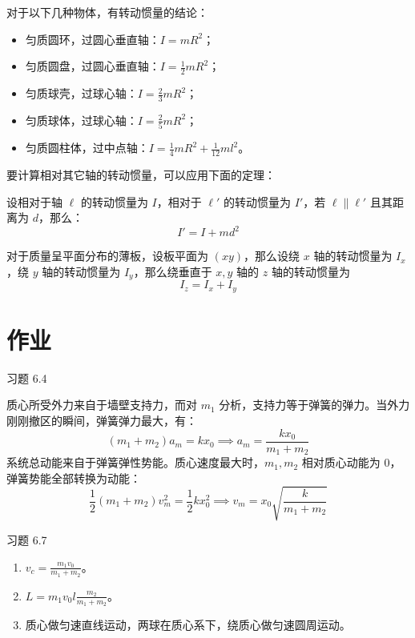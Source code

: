 对于以下几种物体，有转动惯量的结论：

\begin{itemize}
    \item 匀质圆环，过圆心垂直轴：$I = m R^2$；
    \item 匀质圆盘，过圆心垂直轴：$I = \frac{1}{2} m R^2$；
    \item 匀质球壳，过球心轴：$I = \frac{2}{3} m R^2$；
    \item 匀质球体，过球心轴：$I = \frac{2}{5} m R^2$；
    \item 匀质圆柱体，过中点轴：$I = \frac{1}{4} m R^2 + \frac{1}{12} m l^2$。
\end{itemize}

要计算相对其它轴的转动惯量，可以应用下面的定理：

\begin{theorem}[平行轴定理]
    设相对于轴 $\ell$ 的转动惯量为 $I$，相对于 $\ell'$ 的转动惯量为 $I'$，若 $\ell \parallel \ell'$ 且其距离为 $d$，那么：
    $$
    I' = I + m d^2
    $$
\end{theorem}

\begin{theorem}[薄板正交轴定理]
    对于质量呈平面分布的薄板，设板平面为 $(x y)$，那么设绕 $x$ 轴的转动惯量为 $I_x$，绕 $y$ 轴的转动惯量为 $I_y$，那么绕垂直于 $x, y$ 轴的 $z$ 轴的转动惯量为
    $$
    I_z = I_x + I_y
    $$
\end{theorem}

\section{作业}

\begin{problem}
    习题 6.4
    \begin{solution}
        质心所受外力来自于墙壁支持力，而对 $m_1$ 分析，支持力等于弹簧的弹力。当外力刚刚撤区的瞬间，弹簧弹力最大，有：
        $$
        (m_1 + m_2) a_m = k x_0 \implies a_m = \frac{k x_0}{m_1 + m_2}
        $$
        系统总动能来自于弹簧弹性势能。质心速度最大时，$m_1, m_2$ 相对质心动能为 $0$，弹簧势能全部转换为动能：
        $$
        \frac{1}{2} (m_1 + m_2) v_m^2 = \frac{1}{2} k x_0^2 \implies v_m = x_0 \sqrt{\frac{k}{m_1 + m_2}}
        $$
    \end{solution}
\end{problem}

\begin{problem}
    习题 6.7
    \begin{solution}
        \begin{enumerate}
            \item[\textbf{1)}] $v_c = \frac{m_1 v_0}{m_1 + m_2}$。
            \item[\textbf{2)}] $L = m_1 v_0 l \frac{m_2}{m_1 + m_2}$。
            \item[\textbf{3)}] 质心做匀速直线运动，两球在质心系下，绕质心做匀速圆周运动。
        \end{enumerate}
    \end{solution}
\end{problem}


